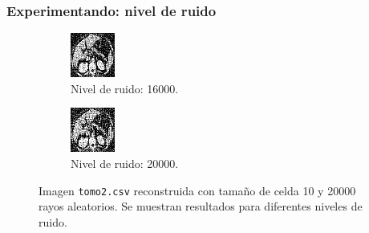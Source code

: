 \documentclass{beamer}
\begin{document}
\begin{frame}
\frametitle{Experimentando: nivel de ruido}

\begin{figure}
\centering
\begin{subfigure}{0.49\textwidth}
  \centering
  \includegraphics[width=0.6\linewidth]{ruido/tomo2-ruido16000}
  \caption{Nivel de ruido: 16000.}
\end{subfigure}
\begin{subfigure}{0.49\textwidth}
  \centering
  \includegraphics[width=0.6\linewidth]{ruido/tomo2-ruido20000}
  \caption{Nivel de ruido: 20000.}
\end{subfigure}
\caption{Imagen \texttt{tomo2.csv} reconstruida con tamaño de celda 10 y 20000 rayos aleatorios. Se 
muestran resultados para diferentes niveles de ruido.}
\label{fig:muestras_ruido}
\end{figure}


\end{frame}
\end{document}
